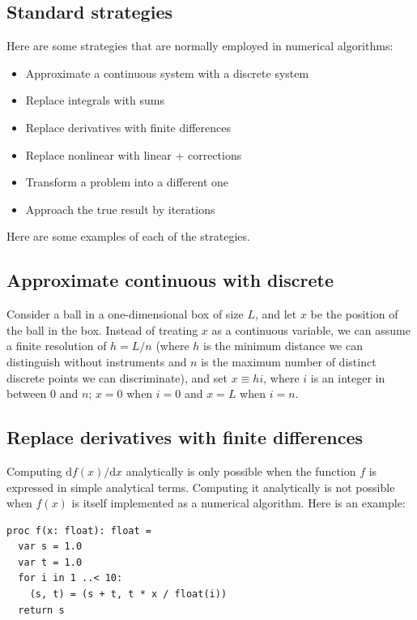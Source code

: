 \documentclass[justified, sixbynine]{tufte-book}
\theoremstyle{plain}%
\newtheorem * {corollary}{Corollary}
\theoremstyle{definition}
\theoremstyle{remark}
\newtheorem * {remark}{Remark}
\newtheorem * {note}{Note}
\begin{document}
\begin{fullwidth}
\goodbreak\section{Standard strategies}

Here are some strategies that are normally employed in numerical algorithms:

\begin{itemize}
\item Approximate a continuous system with a discrete system
\item Replace integrals with sums
\item Replace derivatives with finite differences
\item Replace nonlinear with linear + corrections
\item Transform a problem into a different one
\item Approach the true result by iterations
\end{itemize}

Here are some examples of each of the strategies.

\goodbreak\subsection{Approximate continuous with discrete}

Consider a ball in a one-dimensional box of size $L$, and let $x$ be the position of the ball in the box. Instead of treating $x$ as a continuous variable, we can assume a finite resolution of $h = L/n$ (where $h$ is the minimum distance we can distinguish without instruments and $n$ is the maximum number of distinct discrete points we can discriminate), and set $x \equiv h i$, where $i$ is an integer in between $0$ and $n$; $x=0$ when $i=0$ and $x=L$ when $i=n$.


\goodbreak\subsection{Replace derivatives with finite differences}


Computing $\textrm{d}f(x)/\textrm{d}x$ analytically is only possible when the function $f$ is expressed in simple analytical terms. Computing it analytically is not possible when $f(x)$ is itself implemented as a numerical algorithm. Here is an example:

\begin{lstlisting}
proc f(x: float): float =
  var s = 1.0
  var t = 1.0
  for i in 1 ..< 10:
    (s, t) = (s + t, t * x / float(i))
  return s
\end{lstlisting}


\end{fullwidth}
\end{document}
